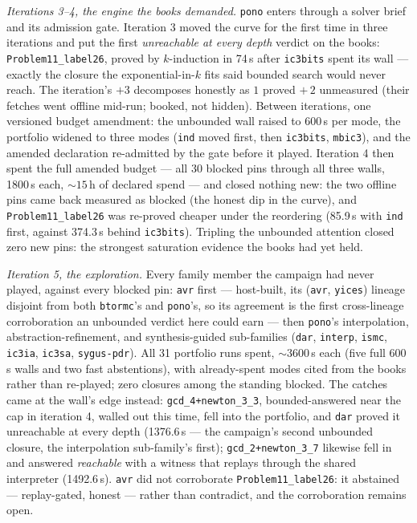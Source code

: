 \emph{Iterations 3--4, the engine the books demanded.}
\texttt{pono} enters through a solver brief and its admission gate.
Iteration 3 moved the curve for the first time in three iterations
and put the first \textit{unreachable at every depth} verdict on the
books: \texttt{Problem11\_label26}, proved by $k$-induction in 74\,s
after \texttt{ic3bits} spent its wall --- exactly the closure the
exponential-in-$k$ fits said bounded search would never reach. The
iteration's $+3$ decomposes honestly as $1$ proved $+\,2$ unmeasured
(their fetches went offline mid-run; booked, not hidden). Between
iterations, one versioned budget amendment: the unbounded wall
raised to 600\,s per mode, the portfolio widened to three modes
(\texttt{ind} moved first, then \texttt{ic3bits}, \texttt{mbic3}),
and the amended declaration re-admitted by the gate before it
played. Iteration 4 then spent the full amended
budget --- all 30 blocked pins through all three walls, 1800\,s
each, ${\sim}15$\,h of declared spend --- and closed nothing new:
the two offline pins came back measured as blocked (the honest dip
in the curve), and \texttt{Problem11\_label26} was re-proved cheaper
under the reordering (85.9\,s with \texttt{ind} first, against
374.3\,s behind \texttt{ic3bits}). Tripling the unbounded attention
closed zero new pins: the strongest saturation evidence the books
had yet held.

\emph{Iteration 5, the exploration.} Every family member the
campaign had never played, against every blocked pin: \texttt{avr}
first --- host-built, its (\texttt{avr}, \texttt{yices}) lineage
disjoint from both \texttt{btormc}'s and \texttt{pono}'s, so its
agreement is the first cross-lineage corroboration an unbounded
verdict here could earn --- then \texttt{pono}'s interpolation,
abstraction-refinement, and synthesis-guided sub-families
(\texttt{dar}, \texttt{interp}, \texttt{ismc}, \texttt{ic3ia},
\texttt{ic3sa}, \texttt{sygus-pdr}). All 31
portfolio runs spent, ${\sim}3600$\,s each (five full 600\,s walls
and two fast abstentions), with already-spent modes cited from the
books rather than re-played; zero closures among the standing
blocked. The catches came at the wall's edge instead:
\texttt{gcd\_4+newton\_3\_3}, bounded-answered near the cap in
iteration 4, walled out this time, fell into the portfolio, and
\texttt{dar} proved it unreachable at every depth (1376.6\,s --- the
campaign's second unbounded closure, the interpolation sub-family's
first); \texttt{gcd\_2+newton\_3\_7} likewise fell in and answered
\textit{reachable} with a witness that replays through the shared
interpreter (1492.6\,s). \texttt{avr} did not corroborate
\texttt{Problem11\_label26}: it abstained --- replay-gated, honest
--- rather than contradict, and the corroboration remains open.

